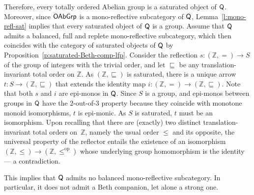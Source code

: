 \documentclass[a4paper,10pt,reqno]{amsart}
\theoremstyle{definition}
\theoremstyle{remark}
\newcommand{\Z}{\mathbb{Z}}				%
\newcommand{\COAMon}{\sf Q} %
\newcommand{\OAGrp}{{\sf OAbGrp}}						%
\newcommand{\op}{{\mathrm{op}}}						%
\renewcommand{\leq}{\leqslant}
\begin{document}
Therefore, every totally ordered Abelian group is a saturated object of $\COAMon$. Moreover, since $\OAGrp$ is a mono-reflective subcategory of $\COAMon$, Lemma~\ref{l:mono-refl-sat} implies that every saturated object of $\COAMon$ is a group. Assume that $\COAMon$ admits a balanced, full and replete mono-reflective subcategory, which then coincides with the category of saturated objects of $\COAMon$ by Proposition~\ref{p:saturated-Beth-comp-lfp}. Consider the reflection $s\colon (\Z,=)\to S$ of the group of integers with the trivial order, and let $\sqsubseteq$ be any translation-invariant total order on $\Z$. As $(\Z, \sqsubseteq)$ is saturated, there is a unique arrow $t\colon S \to (\Z,\sqsubseteq)$ that extends the identity map $i\colon (\Z,=) \to (\Z,\sqsubseteq)$. Note that both $s$ and $i$ are epi-monos in $\COAMon$. Since $S$ is a group, and epi-monos between groups in $\COAMon$ have the 2-out-of-3 property because they coincide with monotone monoid isomorphisms, $t$ is epi-monic. As $S$ is saturated, $t$ must be an isomorphism. Upon recalling that there are (exactly) two distinct translation-invariant total orders on~$\Z$, namely the usual order $\leq$ and its opposite, the universal property of the reflector entails the existence of an isomorphism $(\Z,\leq)\to (\Z,\leq^{\op})$ whose underlying group homomorphism is the identity --- a contradiction.

This implies that $\COAMon$ admits no balanced mono-reflective subcategory. In particular, it does not admit a Beth companion, let alone a strong one.
\end{document}
